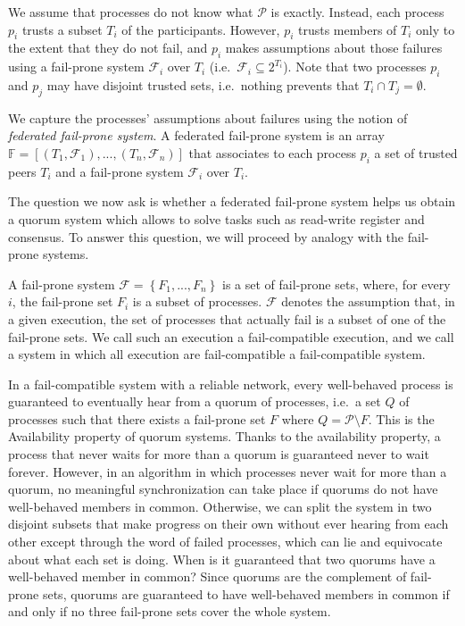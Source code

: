 \documentclass[11pt,letterpaper]{article}
\begin{document}
We assume that processes do not know what $\mathcal{P}$ is exactly.
Instead, each process $p_i$ trusts a subset $T_i$ of the participants.
However, $p_i$ trusts members of $T_i$ only to the extent that they do not fail, and $p_i$ makes assumptions about those failures using a fail-prone system $\mathcal{F}_i$ over $T_i$ (i.e.\ $\mathcal{F}_i\subseteq 2^{T_i}$).
Note that two processes $p_i$ and $p_j$ may have disjoint trusted sets, i.e.\ nothing prevents that $T_i\cap T_j=\emptyset$.

We capture the processes' assumptions about failures using the notion of \emph{federated fail-prone system}. A federated fail-prone system is an array $\mathbb{F}=\left[\left(T_1,\mathcal{F}_1\right),...,\left(T_n,\mathcal{F}_n\right)\right]$ that associates to each process $p_i$ a set of trusted peers $T_i$ and a fail-prone system $\mathcal{F}_i$ over $T_i$.

The question we now ask is whether a federated fail-prone system helps us obtain a quorum system which allows to solve tasks such as read-write register and consensus.
To answer this question, we will proceed by analogy with the fail-prone systems.

A fail-prone system $\mathcal{F}=\left\{F_1,...,F_n\right\}$ is a set of fail-prone sets, where, for every $i$, the fail-prone set $F_i$ is a subset of processes.
$\mathcal{F}$ denotes the assumption that, in a given execution, the set of processes that actually fail is a subset of one of the fail-prone sets.
We call such an execution a fail-compatible execution, and we call a system in which all execution are fail-compatible a fail-compatible system.

In a fail-compatible system with a reliable network, every well-behaved process is guaranteed to eventually hear from a quorum of processes, i.e.\ a set $Q$ of processes such that there exists a fail-prone set $F$ where $Q=\mathcal{P}\setminus F$.
This is the Availability property of quorum systems.
Thanks to the availability property, a process that never waits for more than a quorum is guaranteed never to wait forever.
However, in an algorithm in which processes never wait for more than a quorum, no meaningful synchronization can take place if quorums do not have well-behaved members in common.
Otherwise, we can split the system in two disjoint subsets that make progress on their own without ever hearing from each other except through the word of failed processes, which can lie and equivocate about what each set is doing.
When is it guaranteed that two quorums have a well-behaved member in common?
Since quorums are the complement of fail-prone sets, quorums are guaranteed to have well-behaved members in common if and only if no three fail-prone sets cover the whole system.
\end{document}
